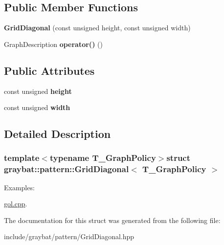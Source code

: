 \subsection*{Public Member Functions}
\begin{DoxyCompactItemize}
\item 
\hypertarget{structgraybat_1_1pattern_1_1GridDiagonal_af223de3b38edca5062c166d174e5241a}{}{\bfseries Grid\+Diagonal} (const unsigned height, const unsigned width)\label{structgraybat_1_1pattern_1_1GridDiagonal_af223de3b38edca5062c166d174e5241a}

\item 
\hypertarget{structgraybat_1_1pattern_1_1GridDiagonal_ab54d1253194770dc534ba24dfb3e3028}{}Graph\+Description {\bfseries operator()} ()\label{structgraybat_1_1pattern_1_1GridDiagonal_ab54d1253194770dc534ba24dfb3e3028}

\end{DoxyCompactItemize}
\subsection*{Public Attributes}
\begin{DoxyCompactItemize}
\item 
\hypertarget{structgraybat_1_1pattern_1_1GridDiagonal_a3c3d0f74f66d9c07dbc3ca7931df3536}{}const unsigned {\bfseries height}\label{structgraybat_1_1pattern_1_1GridDiagonal_a3c3d0f74f66d9c07dbc3ca7931df3536}

\item 
\hypertarget{structgraybat_1_1pattern_1_1GridDiagonal_a4bfb947ac19e5dda7b5769099efe9c69}{}const unsigned {\bfseries width}\label{structgraybat_1_1pattern_1_1GridDiagonal_a4bfb947ac19e5dda7b5769099efe9c69}

\end{DoxyCompactItemize}


\subsection{Detailed Description}
\subsubsection*{template$<$typename T\+\_\+\+Graph\+Policy$>$struct graybat\+::pattern\+::\+Grid\+Diagonal$<$ T\+\_\+\+Graph\+Policy $>$}

\begin{Desc}
\item[Examples\+: ]\par
\hyperlink{gol_8cpp-example}{gol.\+cpp}.\end{Desc}


The documentation for this struct was generated from the following file\+:\begin{DoxyCompactItemize}
\item 
include/graybat/pattern/Grid\+Diagonal.\+hpp\end{DoxyCompactItemize}
